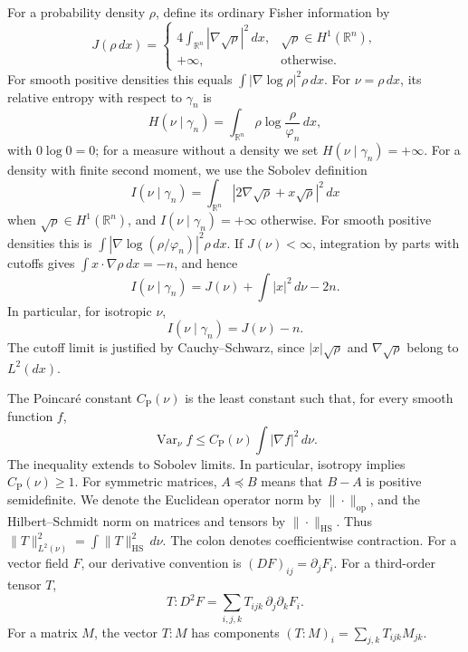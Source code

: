 \documentclass[11pt]{amsart}
\numberwithin{equation}{section}
\theoremstyle{definition}
\theoremstyle{remark}
\newcommand{\R}{\mathbb R}
\newcommand{\gam}{\gamma_n}
\newcommand{\CP}{C_{\mathrm P}}
\newcommand{\HS}{\mathrm{HS}}
\newcommand{\op}{\mathrm{op}}
\DeclareMathOperator{\Var}{Var}
\begin{document}
For a probability density \(\rho\), define its ordinary Fisher
information by
\begin{equation}\label{eq:ordinary-fisher}
J(\rho\,dx)=
\begin{cases}
4\displaystyle\int_{\R^n}|\nabla\sqrt{\rho}|^2\,dx,
 &\sqrt{\rho}\in H^1(\R^n),\\
+\infty,&\text{otherwise}.
\end{cases}
\end{equation}
For smooth positive densities this equals
\(\int|\nabla\log\rho|^2\rho\,dx\).
For \(\nu=\rho\,dx\), its relative entropy with respect to \(\gam\) is
\[
H(\nu\mid\gam)=\int_{\R^n}
 \rho\log\frac{\rho}{\varphi_n}\,dx,
\]
with \(0\log0=0\); for a measure without a density we set
\(H(\nu\mid\gam)=+\infty\). For a density with finite second moment,
we use the
Sobolev definition
\[
I(\nu\mid\gam)=
\int_{\R^n}|2\nabla\sqrt\rho+x\sqrt\rho|^2\,dx
\]
when \(\sqrt\rho\in H^1(\R^n)\), and \(I(\nu\mid\gam)=+\infty\)
otherwise. For smooth positive densities this is
\(\int|\nabla\log(\rho/\varphi_n)|^2\rho\,dx\).
If \(J(\nu)<\infty\), integration by parts with cutoffs gives
\(\int x\cdot\nabla\rho\,dx=-n\), and hence
\[
I(\nu\mid\gam)=J(\nu)+\int|x|^2\,d\nu-2n.
\]
In particular, for isotropic \(\nu\),
\begin{equation}\label{eq:relative-ordinary}
I(\nu\mid\gam)=J(\nu)-n.
\end{equation}
The cutoff limit is justified by Cauchy--Schwarz, since
\(|x|\sqrt\rho\) and \(\nabla\sqrt\rho\) belong to \(L^2(dx)\).

The Poincar\'e constant \(\CP(\nu)\) is the least constant such that,
for every smooth function \(f\),
\begin{equation}\label{eq:poincare}
\Var_\nu f\le \CP(\nu)\int|\nabla f|^2\,d\nu.
\end{equation}
The inequality extends to Sobolev limits. In particular, isotropy implies
\(\CP(\nu)\ge1\).
For symmetric matrices, \(A\preceq B\) means that \(B-A\) is positive
semidefinite. We denote the Euclidean operator norm by
\(\|\cdot\|_{\op}\), and the Hilbert--Schmidt norm on matrices and
tensors by \(\|\cdot\|_{\HS}\). Thus
\(\|T\|_{L^2(\nu)}^2=\int\|T\|_{\HS}^2\,d\nu\).
The colon denotes coefficientwise contraction. For a vector field
\(F\), our derivative convention is \((DF)_{ij}=\partial_jF_i\).
For a third-order tensor \(T\),
\[
T:D^2F=\sum_{i,j,k}T_{ijk}\,\partial_j\partial_k F_i.
\]
For a matrix \(M\), the vector \(T:M\) has components
\((T:M)_i=\sum_{j,k}T_{ijk}M_{jk}\).
\end{document}
